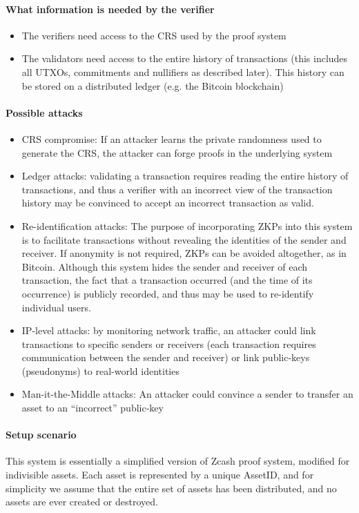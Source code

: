 \paragraph[:]{What information is needed by the verifier}
\begin{itemize}
 \item The verifiers need access  to the CRS used by the proof system
 \item The validators need access to the entire history of transactions (this includes all UTXOs, commitments and nullifiers as described later).  This history can be stored on a distributed ledger (e.g. the Bitcoin blockchain)
\end{itemize}
		
		
\paragraph[:]{Possible attacks}
\begin{itemize}
 \item CRS compromise: If an attacker learns the private randomness used to generate the CRS, the attacker can forge proofs in the underlying system
 \item Ledger attacks: validating a transaction requires reading the entire history of transactions, and thus a verifier with an incorrect view of the transaction history may be convinced to accept an incorrect transaction as valid.
 \item Re-identification attacks: The purpose of incorporating ZKPs into this system is to facilitate transactions without revealing the identities of the sender and receiver.  If anonymity is not required, ZKPs can be avoided altogether, as in Bitcoin.  Although this system hides the sender and receiver of each transaction, the fact that a transaction occurred (and the time of its occurrence) is publicly recorded, and thus may be used to re-identify individual users.
 \item IP-level attacks: by monitoring network traffic, an attacker could link transactions to specific senders or receivers (each transaction requires communication between the sender and receiver) or link public-keys (pseudonyms) to real-world identities
 \item Man-it-the-Middle attacks: An attacker could convince a sender to transfer an asset to an ``incorrect'' public-key
\end{itemize}


\paragraph[:]{Setup scenario}  This system is essentially a simplified version of Zcash proof system, modified for indivisible assets.  Each asset is represented by a unique AssetID, and for simplicity we assume that the entire set of assets has been distributed, and no assets are ever created or destroyed.

